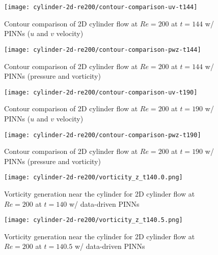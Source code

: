 \begin{figure}[!hbt]
    \centering%
    \texttt{[image: cylinder-2d-re200/contour-comparison-uv-t144]}%
    \caption{%
        Contour comparison of 2D cylinder flow at $Re=\num{200}$ at $t=144$ w/ PINNs ($u$ and $v$ velocity)
    }
    \label{fig:cylinder-re200-pinn-contours-uv-t144}%
\end{figure}

\begin{figure}[!hbt]
    \centering%
    \texttt{[image: cylinder-2d-re200/contour-comparison-pwz-t144]}%
    \caption{%
        Contour comparison of 2D cylinder flow at $Re=\num{200}$ at $t=144$ w/ PINNs (pressure and vorticity)
    }
    \label{fig:cylinder-re200-pinn-contours-pwz-t144}%
\end{figure}

\begin{figure}[!hbt]
    \centering%
    \texttt{[image: cylinder-2d-re200/contour-comparison-uv-t190]}%
    \caption{%
        Contour comparison of 2D cylinder flow at $Re=\num{200}$ at $t=190$ w/ PINNs ($u$ and $v$ velocity)
    }
    \label{fig:cylinder-re200-pinn-contours-uv-t190}%
\end{figure}

\begin{figure}[!hbt]
    \centering%
    \texttt{[image: cylinder-2d-re200/contour-comparison-pwz-t190]}%
    \caption{%
        Contour comparison of 2D cylinder flow at $Re=\num{200}$ at $t=190$ w/ PINNs (pressure and vorticity)
    }
    \label{fig:cylinder-re200-pinn-contours-pwz-t190}%
\end{figure}

\begin{figure}[!hbt]
    \centering%
    \texttt{[image: cylinder-2d-re200/vorticity\_z\_t140.0.png]}%
    \caption{%
        Vorticity generation near the cylinder for 2D cylinder flow at $Re=\num{200}$ at $t=140$ w/ data-driven PINNs
    }
    \label{fig:cylinder-re200-pinn-vort-gen-t140.0}%
\end{figure}

\begin{figure}[!hbt]
    \centering%
    \texttt{[image: cylinder-2d-re200/vorticity\_z\_t140.5.png]}%
    \caption{%
        Vorticity generation near the cylinder for 2D cylinder flow at $Re=\num{200}$ at $t=140.5$ w/ data-driven PINNs
    }
    \label{fig:cylinder-re200-pinn-vort-gen-t140.5}%
\end{figure}


